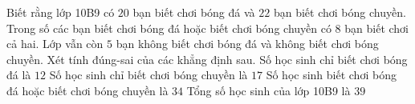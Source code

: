 \begin{ex}
 Biết rằng lớp 10B9 có ${20}$ bạn biết chơi bóng đá và ${22}$ bạn biết chơi bóng chuyền. Trong số các bạn biết chơi bóng đá hoặc biết chơi bóng chuyền có ${8}$ bạn biết chơi cả hai. Lớp vẫn còn ${5}$ bạn không biết chơi bóng đá và không biết chơi bóng chuyền. Xét tính đúng-sai của các khẳng định sau.
\choiceTFt
{ \True Số học sinh chỉ biết chơi bóng đá là ${12}$ }
   { Số học sinh chỉ biết chơi bóng chuyền là ${17}$  }
     { \True Số học sinh biết chơi bóng đá hoặc biết chơi bóng chuyền là ${34}$ }
    { \True Tổng số học sinh của lớp 10B9 là ${39}$ }
\end{ex}

